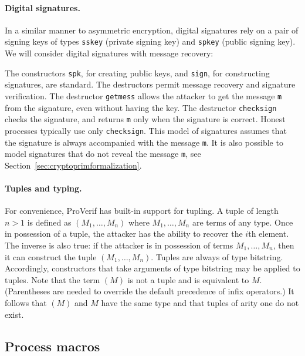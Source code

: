 \documentclass{book}
\begin{document}
\paragraph{Digital signatures.} In a similar manner to asymmetric encryption, digital signatures rely on a pair of signing keys of types \lstinline{sskey} (private signing key) and \lstinline{spkey} (public signing key). We will consider digital signatures with message recovery:
%

%
The constructors \lstinline{spk}, for creating public keys, and \lstinline{sign}, for constructing signatures, are standard.
The destructors permit message recovery and signature verification. The destructor \lstinline!getmess! allows the
attacker to get the message \lstinline!m! from the signature, even without having the key. The destructor
\lstinline!checksign! checks the signature, and returns \lstinline!m! only when the signature is correct. Honest
processes typically use only \lstinline!checksign!. This model of signatures assumes that the signature is
always accompanied with the message \lstinline!m!. It is also possible to model signatures that do not
reveal the message \lstinline!m!, see Section~\ref{sec:cryptoprimformalization}.


\paragraph{Tuples and typing.} For convenience, ProVerif has built-in support for tupling. A tuple of length $n > 1$ is defined as $(M_1,\ldots,M_n)$ where $M_1,\ldots,M_n$ are terms of any type. Once in possession of a tuple, the attacker has the ability to recover the $i$th element. The inverse is also true: if the attacker is in possession of terms  $M_1,\ldots,M_n$, then it can construct the tuple $(M_1,\ldots,M_n)$. Tuples are always of type bitstring. Accordingly, constructors that take arguments of type bitstring may be applied to tuples.
Note that the term $(M)$ is not a tuple and is equivalent to $M$. (Parentheses are needed to override the default precedence of infix operators.) It follows that $(M)$ and $M$ have the same type and that tuples of arity one do not exist.

\subsection{Process macros}\label{sec:macro}
\end{document}
